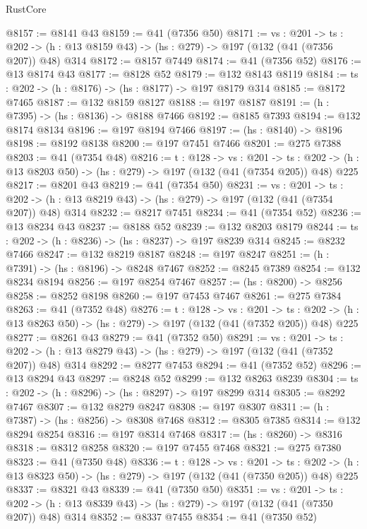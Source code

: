 \begin{lexlean}{RustCore}
\begin{coremodule}
@8157 := @8141 @43
@8159 := @41 (@7356 @50)
@8171 := {vs : @201} ->
  {ts : @202} -> (h : @13 @8159 @43) -> (hs : @279) -> @197 (@132 (@41 (@7356 @207)) @48) @314
@8172 := @8157 @7449
@8174 := @41 (@7356 @52)
@8176 := @13 @8174 @43
@8177 := @8128 @52
@8179 := @132 @8143 @8119
@8184 := {ts : @202} -> (h : @8176) -> (hs : @8177) -> @197 @8179 @314
@8185 := @8172 @7465
@8187 := @132 @8159 @8127
@8188 := @197 @8187
@8191 := (h : @7395) -> (hs : @8136) -> @8188 @7466
@8192 := @8185 @7393
@8194 := @132 @8174 @8134
@8196 := @197 @8194 @7466
@8197 := (hs : @8140) -> @8196
@8198 := @8192 @8138
@8200 := @197 @7451 @7466
@8201 := @275 @7388
@8203 := @41 (@7354 @48)
@8216 := {t : @128} ->
  {vs : @201} ->
  {ts : @202} -> (h : @13 @8203 @50) -> (hs : @279) -> @197 (@132 (@41 (@7354 @205)) @48) @225
@8217 := @8201 @43
@8219 := @41 (@7354 @50)
@8231 := {vs : @201} ->
  {ts : @202} -> (h : @13 @8219 @43) -> (hs : @279) -> @197 (@132 (@41 (@7354 @207)) @48) @314
@8232 := @8217 @7451
@8234 := @41 (@7354 @52)
@8236 := @13 @8234 @43
@8237 := @8188 @52
@8239 := @132 @8203 @8179
@8244 := {ts : @202} -> (h : @8236) -> (hs : @8237) -> @197 @8239 @314
@8245 := @8232 @7466
@8247 := @132 @8219 @8187
@8248 := @197 @8247
@8251 := (h : @7391) -> (hs : @8196) -> @8248 @7467
@8252 := @8245 @7389
@8254 := @132 @8234 @8194
@8256 := @197 @8254 @7467
@8257 := (hs : @8200) -> @8256
@8258 := @8252 @8198
@8260 := @197 @7453 @7467
@8261 := @275 @7384
@8263 := @41 (@7352 @48)
@8276 := {t : @128} ->
  {vs : @201} ->
  {ts : @202} -> (h : @13 @8263 @50) -> (hs : @279) -> @197 (@132 (@41 (@7352 @205)) @48) @225
@8277 := @8261 @43
@8279 := @41 (@7352 @50)
@8291 := {vs : @201} ->
  {ts : @202} -> (h : @13 @8279 @43) -> (hs : @279) -> @197 (@132 (@41 (@7352 @207)) @48) @314
@8292 := @8277 @7453
@8294 := @41 (@7352 @52)
@8296 := @13 @8294 @43
@8297 := @8248 @52
@8299 := @132 @8263 @8239
@8304 := {ts : @202} -> (h : @8296) -> (hs : @8297) -> @197 @8299 @314
@8305 := @8292 @7467
@8307 := @132 @8279 @8247
@8308 := @197 @8307
@8311 := (h : @7387) -> (hs : @8256) -> @8308 @7468
@8312 := @8305 @7385
@8314 := @132 @8294 @8254
@8316 := @197 @8314 @7468
@8317 := (hs : @8260) -> @8316
@8318 := @8312 @8258
@8320 := @197 @7455 @7468
@8321 := @275 @7380
@8323 := @41 (@7350 @48)
@8336 := {t : @128} ->
  {vs : @201} ->
  {ts : @202} -> (h : @13 @8323 @50) -> (hs : @279) -> @197 (@132 (@41 (@7350 @205)) @48) @225
@8337 := @8321 @43
@8339 := @41 (@7350 @50)
@8351 := {vs : @201} ->
  {ts : @202} -> (h : @13 @8339 @43) -> (hs : @279) -> @197 (@132 (@41 (@7350 @207)) @48) @314
@8352 := @8337 @7455
@8354 := @41 (@7350 @52)

\end{coremodule}
\end{lexlean}
